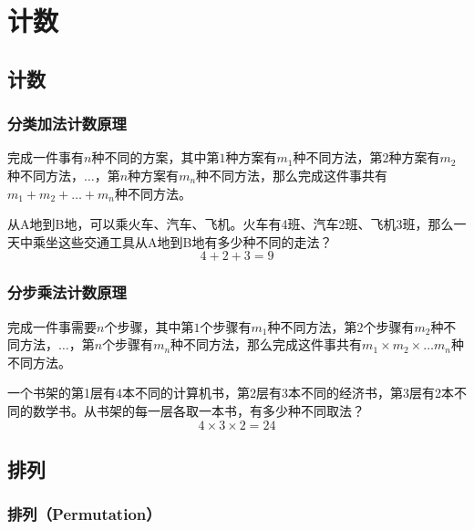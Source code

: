 \chapter{计数}

\section{计数}

\subsection{分类加法计数原理}

完成一件事有$ n $种不同的方案，其中第$ 1 $种方案有$ m_1 $种不同方法，第$ 2 $种方案有$ m_2 $种不同方法，$ \dots $，第$ n $种方案有$ m_n $种不同方法，那么完成这件事共有$ m_1 + m_2 + \dots + m_n $种不同方法。

\begin{tcolorbox}
	从A地到B地，可以乘火车、汽车、飞机。火车有4班、汽车2班、飞机3班，那么一天中乘坐这些交通工具从A地到B地有多少种不同的走法？
	$$
		4 + 2 + 3 = 9
	$$
\end{tcolorbox}

\vspace{0.5cm}

\subsection{分步乘法计数原理}

完成一件事需要$ n $个步骤，其中第$ 1 $个步骤有$ m_1 $种不同方法，第$ 2 $个步骤有$ m_2 $种不同方法，$ \dots $，第$ n $个步骤有$ m_n $种不同方法，那么完成这件事共有$ m_1 \times m_2 \times \dots m_n $种不同方法。

\begin{tcolorbox}
	一个书架的第1层有4本不同的计算机书，第2层有3本不同的经济书，第3层有2本不同的数学书。从书架的每一层各取一本书，有多少种不同取法？
	$$
		4 \times 3 \times 2 = 24
	$$
\end{tcolorbox}

\newpage

\section{排列}

\subsection{排列（Permutation）}

